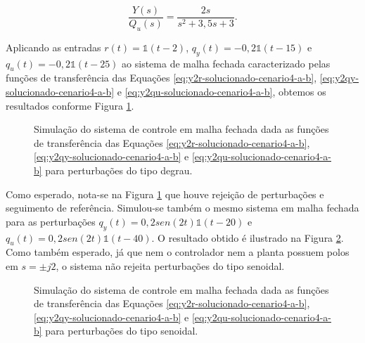 \begin{equation}
    \label{eq:y2qu-solucionado-cenario4-a-b}
    \frac{Y(s)}{Q_{u}(s)} = \frac{2s}{s^2 + 3,5s + 3}.
\end{equation}

Aplicando as entradas $r(t) = \mathds{1}(t - 2)$, $q_{y}(t) = -0,2\mathds{1}(t -
15)$ e $q_{u}(t) = -0,2\mathds{1}(t - 25)$ ao sistema de malha fechada
caracterizado pelas funções de transferência das Equações
\ref{eq:y2r-solucionado-cenario4-a-b}, \ref{eq:y2qy-solucionado-cenario4-a-b} e
\ref{eq:y2qu-solucionado-cenario4-a-b}, obtemos os resultados conforme Figura
\ref{fig:resultado-desafio1-cenario4-a}.

\begin{figure}[!ht]
    \caption{Simulação do sistema de controle em malha fechada dada as funções
    de transferência das Equações
    \ref{eq:y2r-solucionado-cenario4-a-b}, \ref{eq:y2qy-solucionado-cenario4-a-b} e
    \ref{eq:y2qu-solucionado-cenario4-a-b} para perturbações do tipo degrau.}
    \vspace{-10pt}
    \hspace{-30pt}
    \label{fig:resultado-desafio1-cenario4-a}
    \begin{minipage}{\linewidth}
        
    \end{minipage}
\end{figure}

Como esperado, nota-se na Figura \ref{fig:resultado-desafio1-cenario4-a} que
houve rejeição de perturbações e seguimento de referência. Simulou-se também o
mesmo sistema em malha fechada para as perturbações $q_{y}(t) =
0,2sen(2t)\mathds{1}(t - 20)$ e $q_{u}(t) = 0,2sen(2t)\mathds{1}(t - 40)$. O
resultado obtido é ilustrado na Figura \ref{fig:resultado-desafio1-cenario4-b}.
Como também esperado, já que nem o controlador nem a planta possuem polos em $s
= \pm j2$, o sistema não rejeita perturbações do tipo senoidal.

\begin{figure}[!ht]
    \caption{Simulação do sistema de controle em malha fechada dada as funções
    de transferência das Equações
    \ref{eq:y2r-solucionado-cenario4-a-b}, \ref{eq:y2qy-solucionado-cenario4-a-b} e
    \ref{eq:y2qu-solucionado-cenario4-a-b} para perturbações do tipo senoidal.}
    \vspace{-10pt}
    \hspace{-30pt}
    \label{fig:resultado-desafio1-cenario4-b}
    \begin{minipage}{\linewidth}
        
    \end{minipage}
\end{figure}

